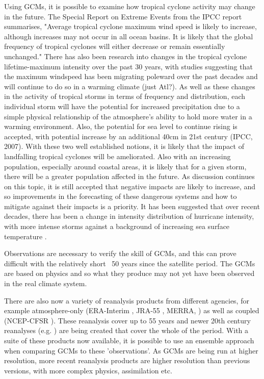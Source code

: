 Using GCMs, it is possible to examine how tropical cyclone activity may change in the future. The Special Report on Extreme Events from the IPCC report \citep{field2012managing} summarises, "Average tropical cyclone maximum wind speed is likely to increase, although increases may not occur in all ocean basins. It is likely that the global frequency of tropical cyclones will either decrease or remain essentially unchanged." There has also been research into changes in the tropical cyclone lifetime-maximum intensity over the past 30 years, with studies suggesting that the maximum windspeed has been migrating poleward over the past decades and will continue to do so in a warming climate \citep{kossin2014poleward} (just Atl?). As well as these changes in the activity of tropical storms in terms of frequency and distribution, each individual storm will have the potential for increased precipitation due to a simple physical relationship of the atmosphere's ability to hold more water in a warming environment. Also, the potential for sea level to continue rising is accepted, with potential increase by an additional 40cm in 21st century (IPCC, 2007). With these two well established notions, it is likely that the impact of landfalling tropical cyclones will be ameliorated. Also with an increasing population, especially around coastal areas, it is likely that for a given storm, there will be a greater population affected in the future. As discussion continues on this topic, it is still accepted that negative impacts are likely to increase, and so improvements in the forecasting of these dangerous systems and how to mitigate against their impacts is a priority.
It has been suggested that over recent decades, there has been a change in intensity distribution of hurricane intensity, with more intense storms against a background of increasing sea surface temperature \citep{webster2005changes, elsner2008increasing}. 

Observations are necessary to verify the skill of GCMs, and this can prove difficult with the relatively short ~50 years since the satellite period. The GCMs are based on physics and so what they produce may not yet have been observed in the real climate system.


There are also now a variety of reanalysis products from different agencies, for example atmosphere-only (ERA-Interim \citep{dee2011era}, JRA-55 \citep{kobayashi2015jra}, MERRA, \citep{rienecker2011merra}) as well as coupled (NCEP-CFSR \citep{saha2010ncep}). These reanalysis cover up to 55 years and newer 20th century reanalyses (e.g. \cite{compo2011twentieth}) are being created that cover the whole of the period. With a suite of these products now available, it is possible to use an ensemble approach when comparing GCMs to these 'observations'. As GCMs are being run at higher resolution, more recent reanalysis products are higher resolution than previous versions, with more complex physics, assimilation etc. 

